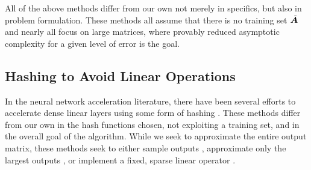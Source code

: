All of the above methods differ from our own not merely in specifics, but also in problem formulation. These methods all assume that there is no training set $\tilde{\bm{A}}$ and nearly all focus on large matrices, where provably reduced asymptotic complexity for a given level of error is the goal. %

\subsection{Hashing to Avoid Linear Operations}

In the neural network acceleration literature, there have been several efforts to accelerate dense linear layers using some form of hashing \cite{springScalable,slide,wtaSoftmax,googleWtaCvpr,hashnet}. These methods differ from our own in the hash functions chosen, not exploiting a training set, and in the overall goal of the algorithm. While we seek to approximate the entire output matrix, these methods seek to either sample outputs \cite{springScalable,slide}, approximate only the largest outputs \cite{wtaSoftmax,googleWtaCvpr}, or implement a fixed, sparse linear operator \cite{hashnet}.


